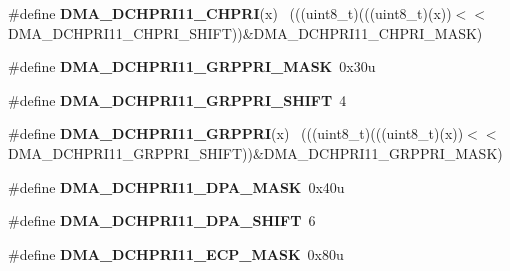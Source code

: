 \begin{DoxyCompactItemize}
\item 
\hypertarget{group___d_m_a___register___masks_gaeed95c80a8e3796a11cb29416343f38f}{}\#define {\bfseries D\+M\+A\+\_\+\+D\+C\+H\+P\+R\+I11\+\_\+\+C\+H\+P\+R\+I}(x)                                    ~(((uint8\+\_\+t)(((uint8\+\_\+t)(x))$<$$<$D\+M\+A\+\_\+\+D\+C\+H\+P\+R\+I11\+\_\+\+C\+H\+P\+R\+I\+\_\+\+S\+H\+I\+F\+T))\&D\+M\+A\+\_\+\+D\+C\+H\+P\+R\+I11\+\_\+\+C\+H\+P\+R\+I\+\_\+\+M\+A\+S\+K)\label{group___d_m_a___register___masks_gaeed95c80a8e3796a11cb29416343f38f}

\item 
\hypertarget{group___d_m_a___register___masks_ga2fb604035cbe565f96a3c99db5bbcdb3}{}\#define {\bfseries D\+M\+A\+\_\+\+D\+C\+H\+P\+R\+I11\+\_\+\+G\+R\+P\+P\+R\+I\+\_\+\+M\+A\+S\+K}~0x30u\label{group___d_m_a___register___masks_ga2fb604035cbe565f96a3c99db5bbcdb3}

\item 
\hypertarget{group___d_m_a___register___masks_gae385e238a8ab7c24b7e752192a6efaf6}{}\#define {\bfseries D\+M\+A\+\_\+\+D\+C\+H\+P\+R\+I11\+\_\+\+G\+R\+P\+P\+R\+I\+\_\+\+S\+H\+I\+F\+T}~4\label{group___d_m_a___register___masks_gae385e238a8ab7c24b7e752192a6efaf6}

\item 
\hypertarget{group___d_m_a___register___masks_gab14940076ac286f7e943f37d9f0940c2}{}\#define {\bfseries D\+M\+A\+\_\+\+D\+C\+H\+P\+R\+I11\+\_\+\+G\+R\+P\+P\+R\+I}(x)                                  ~(((uint8\+\_\+t)(((uint8\+\_\+t)(x))$<$$<$D\+M\+A\+\_\+\+D\+C\+H\+P\+R\+I11\+\_\+\+G\+R\+P\+P\+R\+I\+\_\+\+S\+H\+I\+F\+T))\&D\+M\+A\+\_\+\+D\+C\+H\+P\+R\+I11\+\_\+\+G\+R\+P\+P\+R\+I\+\_\+\+M\+A\+S\+K)\label{group___d_m_a___register___masks_gab14940076ac286f7e943f37d9f0940c2}

\item 
\hypertarget{group___d_m_a___register___masks_gabd5fcd0b0589ce541af05db3c94cf62e}{}\#define {\bfseries D\+M\+A\+\_\+\+D\+C\+H\+P\+R\+I11\+\_\+\+D\+P\+A\+\_\+\+M\+A\+S\+K}~0x40u\label{group___d_m_a___register___masks_gabd5fcd0b0589ce541af05db3c94cf62e}

\item 
\hypertarget{group___d_m_a___register___masks_ga9d922595ae26b09e86e4c7a86a0a476f}{}\#define {\bfseries D\+M\+A\+\_\+\+D\+C\+H\+P\+R\+I11\+\_\+\+D\+P\+A\+\_\+\+S\+H\+I\+F\+T}~6\label{group___d_m_a___register___masks_ga9d922595ae26b09e86e4c7a86a0a476f}

\item 
\hypertarget{group___d_m_a___register___masks_ga0fa3fd877caf7576aa86d45cd74c2f14}{}\#define {\bfseries D\+M\+A\+\_\+\+D\+C\+H\+P\+R\+I11\+\_\+\+E\+C\+P\+\_\+\+M\+A\+S\+K}~0x80u\label{group___d_m_a___register___masks_ga0fa3fd877caf7576aa86d45cd74c2f14}


\end{DoxyCompactItemize}
